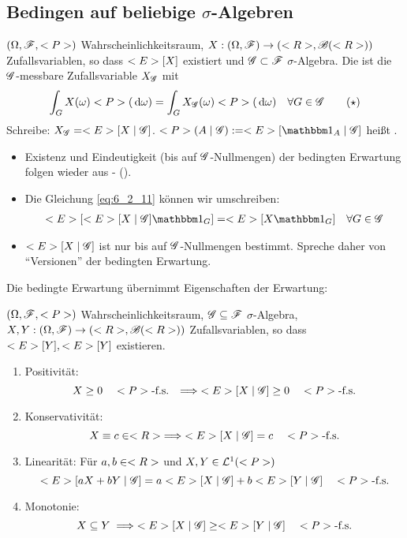 \subsection*{Bedingen auf beliebige $\sigma$-Algebren} %
\begin{definition}
	$(\Omega, \mathscr F, <P>)$ Wahrscheinlichkeitsraum, $X: (\Omega, \mathscr F) \to (<R>, \mathscr{B}(<R>))$ Zufallsvariablen, so dass $<E>[X]$ existiert und $\mathscr{G} \subset \mathscr F$ $\sigma$-Algebra. Die  ist die $\mathscr{G}$-messbare Zufallsvariable $X_{\mathscr{G}}$ mit
	\begin{align*}
		\int_G X(\omega)<P>(\,\mathrm{d} \omega) = \int_G X_{\mathscr{G}}(\omega)<P>(\,\mathrm{d} \omega) \quad \forall G \in \mathscr{G} \label{eq:6_2_11}\tag{$\star$}
	\end{align*}
	Schreibe: $X_{\mathscr{G}} = <E>[X \mid \mathscr{G}]$. $\P(A \mid \G) := \E[\indi_A \mid \G]$ heißt .
\end{definition}
\begin{*remark}
	\begin{itemize}
		\item Existenz und Eindeutigkeit (bis auf $\mathscr{G}$-Nullmengen) der bedingten Erwartung folgen wieder aus - ().
		\item Die Gleichung \eqref{eq:6_2_11} können wir umschreiben:
		\begin{align*}
			\E[\E[X \mid \G]\indi_G] = \E[X \indi_G] \quad \forall G \in \G
		\end{align*}
		\item $<E>[X \mid \mathscr{G}]$ ist nur bis auf $\mathscr{G}$-Nullmengen bestimmt.  Spreche daher von ``Versionen'' der bedingten Erwartung.
	\end{itemize}
\end{*remark}
Die bedingte Erwartung übernimmt Eigenschaften der Erwartung:
\begin{lemma}
	$(\Omega,\mathscr F, <P>)$ Wahrscheinlichkeitsraum, $\mathscr{G} \subseteq \mathscr F$ $\sigma$-Algebra, $X,Y: (\Omega, \mathscr F) \to (<R>, \mathscr{B}(<R>))$ Zufallsvariablen, so dass $<E>[Y],<E>[Y]$ existieren.
	\begin{enumerate}
		\item Positivität:
		\[
			X \ge 0 \quad <P>\text{-f.s. } \implies <E>[X\mid \mathscr{G}] \ge 0\quad <P>\text{-f.s.}
		\]
		\item Konservativität:
		\[
			X \equiv c \in <R> \implies <E>[X \mid \mathscr{G}] = c \quad <P>\text{-f.s.}
		\]
		\item Linearität: Für $a,b \in <R>$ und $X,Y \in \mathcal{L}^{1}(<P>)$
		\[
			<E>[aX + bY \mid \mathscr{G}] = a<E>[X \mid \mathscr{G}] + b <E>[Y \mid \mathscr{G}] \quad <P>\text{-f.s.}
		\]
		\item Monotonie:
		\[
			X \subseteq Y \implies <E>[X \mid \mathscr{G}] \ge <E>[Y \mid \mathscr{G}] \quad <P>\text{-f.s.}
		\]
	\end{enumerate}
\end{lemma}
